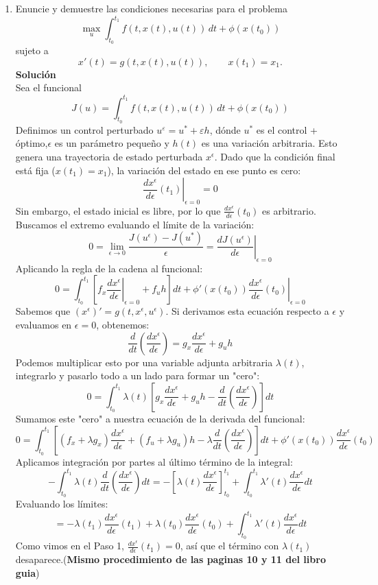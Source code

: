 \documentclass{uofa-eng-assignment}
\begin{document}
\begin{enumerate}
\item[\textbf{Ejercicio 3.4}] Enuncie y demuestre las condiciones necesarias para el problema
\[
\max_{u} \int_{t_0}^{t_1} f(t,x(t),u(t))\,dt + \phi(x(t_0))
\]
sujeto a
\[
x'(t) = g(t,x(t),u(t)), \qquad x(t_1) = x_1.
\]
\textbf{Solución} \\
Sea el funcional 
\[
J(u)=\int_{t_0}^{t_1} f(t,x(t),u(t))\,dt + \phi(x(t_0))
\]
Definimos un control perturbado $u^\varepsilon=u^*+\varepsilon h$, dónde $u^*$ es el control + óptimo,$\epsilon$ es un parámetro pequeño y $h(t)$ es una variación arbitraria. Esto genera una trayectoria de estado perturbada $x^\epsilon$.
Dado que la condición final está fija ($x(t_1) = x_1$), la variación del estado en ese punto es cero:$$\left. \frac{dx^\epsilon}{d\epsilon} (t_1) \right|_{\epsilon=0} = 0$$Sin embargo, el estado inicial es libre, por lo que $\frac{dx^\epsilon}{d\epsilon}(t_0)$ es arbitrario.
Buscamos el extremo evaluando el límite de la variación:$$0 = \lim_{\epsilon \to 0} \frac{J(u^\epsilon) - J(u^*)}{\epsilon} = \left. \frac{d J(u^\epsilon)}{d\epsilon} \right|_{\epsilon=0}$$Aplicando la regla de la cadena al funcional:$$0 = \int_{t_0}^{t_1} \left[ f_x \left. \frac{dx^\epsilon}{d\epsilon} \right|_{\epsilon=0} + f_u h \right] dt + \phi'(x(t_0)) \left. \frac{dx^\epsilon}{d\epsilon} (t_0) \right|_{\epsilon=0}$$
Sabemos que $(x^\epsilon)' = g(t, x^\epsilon, u^\epsilon)$. Si derivamos esta ecuación respecto a $\epsilon$ y evaluamos en $\epsilon=0$, obtenemos:$$\frac{d}{dt} \left( \frac{dx^\epsilon}{d\epsilon} \right) = g_x \frac{dx^\epsilon}{d\epsilon} + g_u h$$Podemos multiplicar esto por una variable adjunta arbitraria $\lambda(t)$, integrarlo y pasarlo todo a un lado para formar un "cero":$$0 = \int_{t_0}^{t_1} \lambda(t) \left[ g_x \frac{dx^\epsilon}{d\epsilon} + g_u h - \frac{d}{dt} \left( \frac{dx^\epsilon}{d\epsilon} \right) \right] dt$$Sumamos este "cero" a nuestra ecuación de la derivada del funcional:$$0 = \int_{t_0}^{t_1} \left[ (f_x + \lambda g_x) \frac{dx^\epsilon}{d\epsilon} + (f_u + \lambda g_u) h - \lambda \frac{d}{dt} \left( \frac{dx^\epsilon}{d\epsilon} \right) \right] dt + \phi'(x(t_0)) \frac{dx^\epsilon}{d\epsilon} (t_0)$$
Aplicamos integración por partes al último término de la integral:$$-\int_{t_0}^{t_1} \lambda(t) \frac{d}{dt} \left( \frac{dx^\epsilon}{d\epsilon} \right) dt = -\left[ \lambda(t) \frac{dx^\epsilon}{d\epsilon} \right]_{t_0}^{t_1} + \int_{t_0}^{t_1} \lambda'(t) \frac{dx^\epsilon}{d\epsilon} dt$$Evaluando los límites:$$= -\lambda(t_1)\frac{dx^\epsilon}{d\epsilon}(t_1) + \lambda(t_0)\frac{dx^\epsilon}{d\epsilon}(t_0) + \int_{t_0}^{t_1} \lambda'(t) \frac{dx^\epsilon}{d\epsilon} dt$$Como vimos en el Paso 1, $\frac{dx^\epsilon}{d\epsilon}(t_1) = 0$, así que el término con $\lambda(t_1)$ desaparece.(\textbf{Mismo procedimiento de las paginas 10 y 11 del libro guia})

\end{enumerate}
\end{document}
